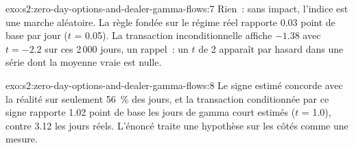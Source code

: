 \begin{solution}{exo:s2:zero-day-options-and-dealer-gamma-flows:7}
Rien~: sans impact, l'indice est une marche aléatoire. La règle fondée sur le régime réel rapporte 0.03 point de base par jour ($t$ = 0.05). La transaction inconditionnelle affiche
$-1.38$ avec $t = -2.2$ sur ces 2\,000 jours, un rappel~: un $t$ de 2 apparaît par hasard dans une série dont la moyenne vraie est nulle.
\end{solution}

\begin{solution}{exo:s2:zero-day-options-and-dealer-gamma-flows:8}
Le signe estimé concorde avec la réalité sur seulement 56~\% des jours, et la transaction conditionnée par ce signe rapporte 1.02 point de base les jours de gamma court estimés
($t$ = 1.0), contre 3.12 les jours réels. L'énoncé traite une hypothèse sur les côtés comme une mesure.
\end{solution}

